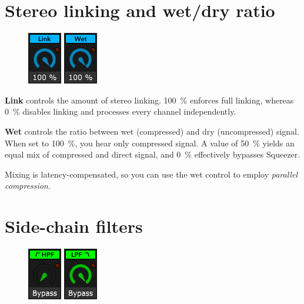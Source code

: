 \section{Stereo linking and wet/dry ratio}

\begin{figure}
  \includegraphics[scale=\screenshotscale,clip]{include/images/knob_stereo_link.png}
  \includegraphics[scale=\screenshotscale,clip]{include/images/knob_wet_dry.png}
\end{figure}

\textbf{Link} controls the amount of stereo linking.
\SI{100}{\percent} enforces full linking, whereas \SI{0}{\percent}
disables linking and processes every channel independently.

\textbf{Wet} controls the ratio between wet (compressed) and dry
(uncompressed) signal.  When set to \SI{100}{\percent}, you hear only
compressed signal.  A value of \SI{50}{\percent} yields an equal mix
of compressed and direct signal, and \SI{0}{\percent} effectively
bypasses Squeezer.

Mixing is latency-compensated, so you can use the wet control to
employ \emph{parallel compression}.

\section{Side-chain filters}

\begin{figure}
  \includegraphics[scale=\screenshotscale,clip]{include/images/knob_hpf_cutoff.png}
  \includegraphics[scale=\screenshotscale,clip]{include/images/knob_lpf_cutoff.png}
\end{figure}

